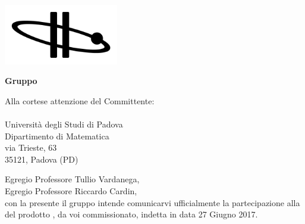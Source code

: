   
\begin{titlepage}
	
	\begin{center}
	 	
	\includegraphics[width=5cm]{../../modello/or-bit_bkg_minBorder.png} 
	\begin{Huge} 
	 	\textbf{Gruppo \GroupName{}}
	\end{Huge}
	\end{center}
	
	\vspace{1cm}
	\begin{large}
	\begin{flushright}
		Alla cortese attenzione del Committente: \\
		\Committente \\
		Università degli Studi di Padova \\
		Dipartimento di Matematica \\
		via Trieste, 63 \\
		35121, Padova (PD) 
		
		\vspace{0,3cm}
		
	
	\end{flushright}

	\vspace{1cm}
	
	Egregio Professore Tullio Vardanega,\\
	Egregio Professore Riccardo Cardin, \\
	
	con la presente il gruppo \GroupName{} intende comunicarvi ufficialmente la partecipazione alla \RA{} del prodotto \ProjectName{}, da voi commissionato, indetta in data 27 Giugno 2017.\\	
	

\end{large}
\end{titlepage}

